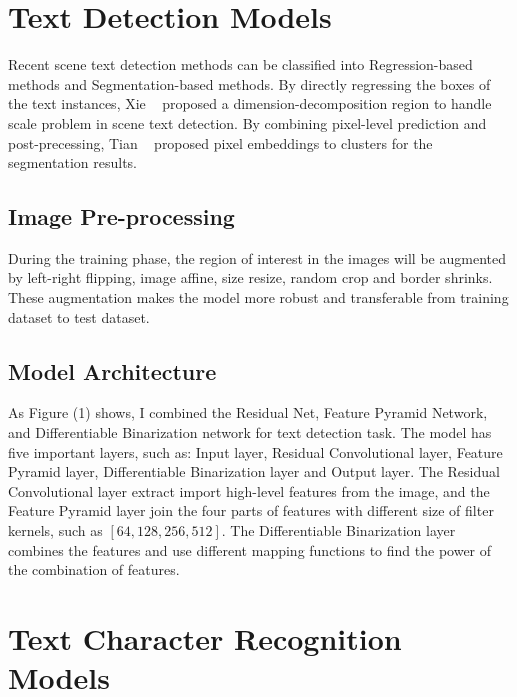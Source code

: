\documentclass[10pt,twocolumn,letterpaper]{article}
\begin{document}

\section{Text Detection Models}



  Recent scene text detection methods can be classified into Regression-based methods and Segmentation-based methods.
  By directly regressing the boxes of the text instances, Xie \etal~\cite{xie2019scene} proposed a dimension-decomposition region to handle scale problem in scene text detection.
  By combining pixel-level prediction and post-precessing, Tian \etal~\cite{tian2019learning} proposed pixel embeddings to clusters for the segmentation results.

\subsection{Image Pre-processing}

  During the training phase, the region of interest in the images will be augmented by left-right flipping, image affine, size resize, random crop and border shrinks.
  These augmentation makes the model more robust and transferable from training dataset to test dataset.

\subsection{Model Architecture}

  As Figure (1) shows, I combined the Residual Net, Feature Pyramid Network, and Differentiable Binarization network for text detection task.
  The model has five important layers, such as: Input layer, Residual Convolutional layer, Feature Pyramid layer, Differentiable Binarization layer and Output layer.
  The Residual Convolutional layer extract import high-level features from the image,
  and the Feature Pyramid layer join the four parts of features with different size of filter kernels, such as $[64,128,256,512]$.
  The Differentiable Binarization layer combines the features and use different mapping functions to find the power of the combination of features.

\section{Text Character Recognition Models}
\end{document}
